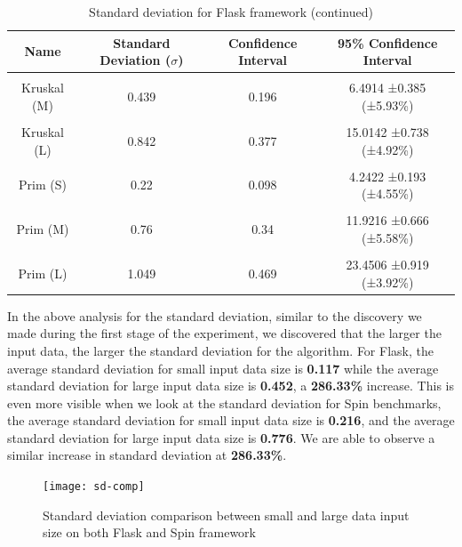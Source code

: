 \newpage
\bigskip
\begin{table}[h!]
\centering
\begin{tabular}{||c c c c||} 
\hline
Name & Standard Deviation ($\sigma$) & Confidence Interval & 95\% Confidence Interval \\ [1ex] 
\hline\hline
 & & & \\
Kruskal (M) & 0.439 & 0.196 & 6.4914 ±0.385 (±5.93\%) \\
 & & & \\
Kruskal (L) & 0.842 & 0.377 & 15.0142 ±0.738 (±4.92\%) \\
 & & & \\
Prim (S) & 0.22 & 0.098 & 4.2422 ±0.193 (±4.55\%) \\
 & & & \\
Prim (M) & 0.76 & 0.34 & 11.9216 ±0.666 (±5.58\%) \\
 & & & \\
Prim (L) & 1.049 & 0.469 & 23.4506 ±0.919 (±3.92\%) \\ [1ex]
\hline
\end{tabular}
\caption{Standard deviation for Flask framework (continued)}
\label{table:time_complexity_2}
\end{table}
\bigskip

In the above analysis for the standard deviation, similar to the discovery we made during the first stage of the experiment, we discovered that the larger the input data, the larger the standard deviation for the algorithm. For Flask, the average standard deviation for small input data size is \textbf{0.117} while the average standard deviation for large input data size is \textbf{0.452}, a \textbf{286.33\%} increase. This is even more visible when we look at the standard deviation for Spin benchmarks, the average standard deviation for small input data size is \textbf{0.216}, and the average standard deviation for large input data size is \textbf{0.776}. We are able to observe a similar increase in standard deviation at \textbf{286.33\%}.

\bigskip
\begin{figure}[hp]
\centering
\texttt{[image: sd-comp]}
\caption{\footnotesize{Standard deviation comparison between small and large data input size on both Flask and Spin framework}}
\captionsetup{aboveskip=0pt,font=it}
\end{figure}
\bigskip